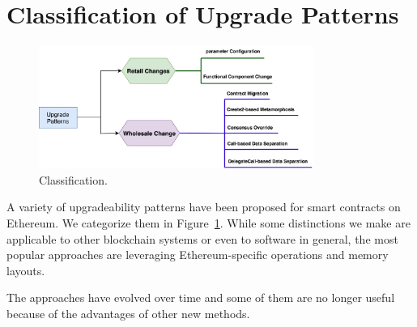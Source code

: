\section{Classification of Upgrade Patterns}

\begin{figure}[t]
  \centering
      \includegraphics[width=0.8\textwidth]{figures/New_Classification.png}
  \caption{Classification. \label{fig:class}}
 \end{figure}
 
A variety of upgradeability patterns have been proposed for smart contracts on Ethereum. We categorize them in Figure~\ref{fig:class}. While some distinctions we make are applicable to other blockchain systems or even to software in general, the most popular approaches are leveraging Ethereum-specific operations and memory layouts.

The approaches have evolved over  time and some of them are no longer useful because of the advantages of other new methods. 




